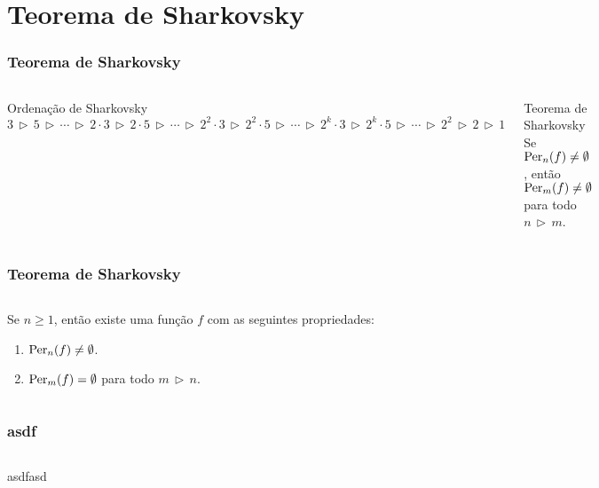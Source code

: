 \section{Teorema de Sharkovsky}

\begin{frame}[t]
\vspace{5pt}
\frametitle{Teorema de Sharkovsky}
\begin{columns}
\column{\dimexpr\paperwidth-5pt}

\begin{definition}{Ordenação de Sharkovsky}
$3 \, \triangleright \, 5 
\, \triangleright \, \cdots \, \triangleright \,
2 \cdot 3 \, \triangleright \, 2 \cdot 5 
\, \triangleright \, \cdots \, \triangleright \,
2^2 \cdot 3 \, \triangleright \, 2^2 \cdot 5
\, \triangleright \, \cdots \, \triangleright \,
2^k \cdot 3 \, \triangleright \, 2^k \cdot 5
\, \triangleright \, \cdots \, \triangleright \,
2^2 \, \triangleright \, 2 \, \triangleright \, 1$
\end{definition}

\pause

\begin{block}{Teorema de Sharkovsky}
Se $\operatorname{Per}_n(f) \neq \emptyset$, então $\operatorname{Per}_m(f) \neq \emptyset$ para todo $n \, \triangleright \, m$.
\end{block}

\end{columns}
\end{frame}


\begin{frame}[t]
\vspace{5pt}
\frametitle{Teorema de Sharkovsky}
\begin{columns}
\column{\dimexpr\paperwidth-5pt}

\begin{theorem}
Se $n \geq 1$, então existe uma função $f$ com as seguintes propriedades:
\begin{enumerate}
\item $\operatorname{Per}_n(f) \neq \emptyset$.
\item $\operatorname{Per}_m(f) =  \emptyset$ para todo $m \, \triangleright \, n$.
\end{enumerate}
\end{theorem}

\end{columns}
\end{frame}

\begin{frame}[t]
\vspace{5pt}
\frametitle{asdf}
\begin{columns}
\column{\dimexpr\paperwidth-5pt}
\begin{theorem}
asdfasd
\end{theorem}
\end{columns}
\end{frame}

